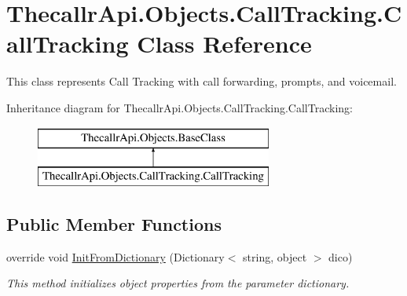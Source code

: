 \hypertarget{class_thecallr_api_1_1_objects_1_1_call_tracking_1_1_call_tracking}{\section{Thecallr\+Api.\+Objects.\+Call\+Tracking.\+Call\+Tracking Class Reference}
\label{class_thecallr_api_1_1_objects_1_1_call_tracking_1_1_call_tracking}
}


This class represents Call Tracking with call forwarding, prompts, and voicemail.  


Inheritance diagram for Thecallr\+Api.\+Objects.\+Call\+Tracking.\+Call\+Tracking\+:\begin{figure}[H]
\begin{center}
\leavevmode
\includegraphics[height=2.000000cm]{class_thecallr_api_1_1_objects_1_1_call_tracking_1_1_call_tracking}
\end{center}
\end{figure}
\subsection*{Public Member Functions}
\begin{DoxyCompactItemize}
\item 
override void \hyperlink{class_thecallr_api_1_1_objects_1_1_call_tracking_1_1_call_tracking_a5d9cf1642ef46b1be795443e0cdcf534}{Init\+From\+Dictionary} (Dictionary$<$ string, object $>$ dico)
\begin{DoxyCompactList}\small\item\em This method initializes object properties from the parameter dictionary. \end{DoxyCompactList}\end{DoxyCompactItemize}
